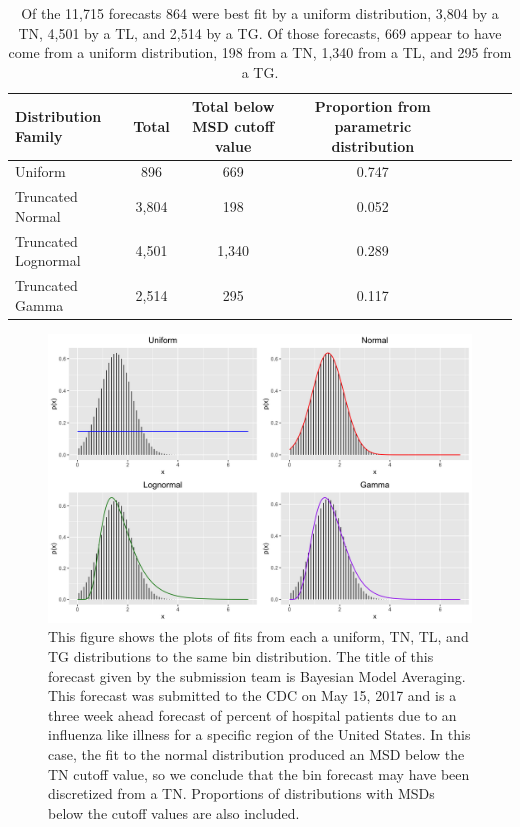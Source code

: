 \documentclass[11pt,notitlepage]{isuthesis}
\begin{document}
\begin{table}[h!]
  \centering
  \begin{tabular}{l*{6}{c}r}
  Distribution Family   & Total    & Total below MSD cutoff value 
  & Proportion from parametric distribution\\
  \hline
  Uniform               & 896      & 669  & 0.747  \\
  Truncated Normal      & 3,804    & 198  & 0.052  \\
  Truncated Lognormal   & 4,501    & 1,340 & 0.289 \\
  Truncated Gamma       & 2,514    & 295   & 0.117 \\
  \end{tabular}
  \begin{center}
\begin{minipage}{10cm}
\captionsetup{font=scriptsize}
  \caption[CDC flu retro analysis results]{Of the 11,715
forecasts 864 were best fit by a uniform distribution, 3,804 by a TN, 
4,501 by a TL, and 2,514 by a TG. Of those forecasts, 669 appear to have
come from a uniform distribution, 198 from a TN, 1,340 from a TL, and 295 from
a TG.
}
  \label{table:cdcresults}
  \end{minipage}
  \end{center}
\end{table}

\begin{figure}[htbp]
\centerline{\includegraphics[scale=.15]{Images/flu_fit_17_10_3.png}}
\caption[Parametric distribution fits to binned distribution]{This figure shows
the plots of fits from each a uniform, TN, TL,
and TG distributions to the same bin distribution. The title of this forecast
given by the submission team is Bayesian Model Averaging. This forecast was
submitted to the CDC on May 15, 2017 and is a three week ahead forecast of
percent of hospital patients due to an influenza like illness for a specific
region of the United States.
In this case, the fit to the normal distribution produced an MSD below the 
TN cutoff value, so we conclude that the bin forecast may have been
discretized from a TN. Proportions of distributions with MSDs 
below the cutoff values are also included.}
\label{fig:binparamfits}
\end{figure}
\end{document}
